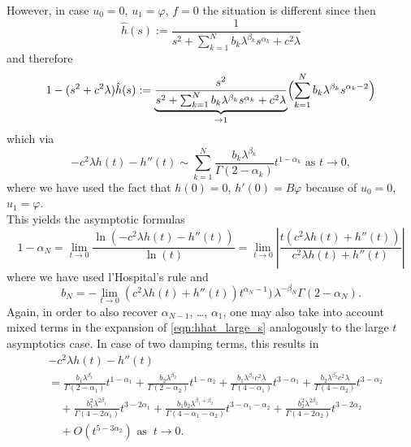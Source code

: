\medskip
However, in case $u_0=0$, $u_1=\varphi$, $f=0$ the situation is different since then 
\begin{equation}\label{eqn:hath_u1}
\hat{h}(s) := \frac{1}{s^2 + \sum_{k=1}^N b_k\lambda^{\beta_k} s^{\alpha_k} + c^2\lambda}
\end{equation}
and therefore 
\begin{equation}\label{eqn:hhat_large_s}
1-(s^2+c^2\lambda)\hat{h}(s) := 
\underbrace{\frac{s^2}{s^2 + \sum_{k=1}^N b_k\lambda^{\beta_k} s^{\alpha_k} + c^2\lambda}}_{\to 1} 
\Bigl(\sum_{k=1}^N b_k\lambda^{\beta_k} s^{\alpha_k-2}\Bigr)
\end{equation}
which via 
\[
-c^2\lambda h(t)-h''(t) \sim 
\sum_{k=1}^N \frac{b_k\lambda^{\beta_k}}{\Gamma(2-\alpha_k)} t^{1-\alpha_k}
\mbox{ as }t\to0,
\]
where we have used the fact that $h(0)=0$, $h'(0)=B\varphi$ because of $u_0=0$, $u_1=\varphi$.
\\
This yields the asymptotic formulas 
\[
1-\alpha_N = \lim_{t\to0}\frac{\ln(-c^2\lambda h(t)-h''(t))}{\ln(t)}
= \lim_{t\to0}\left|\frac{t(c^2\lambda h(t)+h''(t))}{c^2\lambda h(t)+h''(t)}\right|
\]
where we have used l'Hospital's rule and 
\[
b_N = -\lim_{t\to0}(c^2\lambda h(t)+h''(t)) t^{\alpha_N-1})\, \lambda^{-\beta_N}\Gamma(2-\alpha_N).
\]
Again, in order to also recover $\alpha_{N-1}$, \ldots, $\alpha_1$, one may also take into account mixed terms in the expansion of \eqref{eqn:hhat_large_s}
analogously to the large $t$ asymptotics case.
In case of two damping terms, this results in  
\begin{equation}\label{eqn:smalltime}
\begin{aligned}
&-c^2\lambda h(t)-h''(t) \\
&=\frac{b_1\lambda^{\beta_1}}{\Gamma(2-\alpha_1)} t^{1-\alpha_1}
+\frac{b_2\lambda^{\beta_2}}{\Gamma(2-\alpha_2)} t^{1-\alpha_2}
+\frac{b_1\lambda^{\beta_1}c^2\lambda}{\Gamma(4-\alpha_1)} t^{3-\alpha_1}
+\frac{b_2\lambda^{\beta_2}c^2\lambda}{\Gamma(4-\alpha_2)} t^{3-\alpha_2}
\\&\quad+\frac{b_1^2\lambda^{2\beta_1}}{\Gamma(4-2\alpha_1)} t^{3-2\alpha_1}
+\frac{b_1b_2\lambda^{\beta_1+\beta_2}}{\Gamma(4-\alpha_1-\alpha_2)} t^{3-\alpha_1-\alpha_2}
+\frac{b_2^2\lambda^{2\beta_2}}{\Gamma(4-2\alpha_2)} t^{3-2\alpha_2}
\\&\quad+ O(t^{5-3\alpha_2})\mbox{\ \  as }\ t\to0 .
\end{aligned}
\end{equation}
